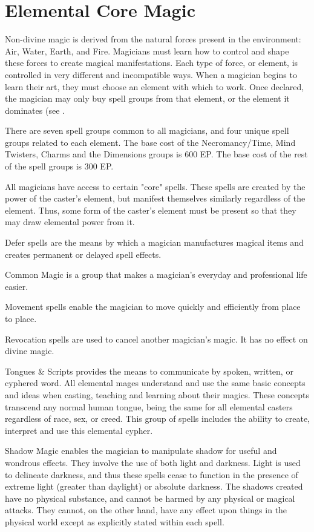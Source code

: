 \chapter{Elemental Core Magic}
\label{ch:elemental-core-magic}
Non-divine magic is derived from the natural forces present in the environment: Air, Water, Earth, and Fire. Magicians must learn how to control and shape these forces to create magical manifestations. Each type of force, or element, is controlled in very different and incompatible ways. When a magician begins to learn their art, they must choose an element with which to work. Once declared, the magician may only buy spell groups from that element, or the element it dominates (see .

There are seven spell groups common to all magicians, and four unique spell groups related to each element. The base cost of the Necromancy/Time, Mind Twisters, Charms and the Dimensions groups is 600 EP. The base cost of the rest of the spell groups is 300 EP.

All magicians have access to certain "core" spells. These spells are created by the power of the caster's element, but manifest themselves similarly regardless of the element. Thus, some form of the caster's element must be present so that they may draw elemental power from it.


Defer spells are the means by which a magician manufactures magical items and creates permanent or delayed spell effects.

Common Magic is a group that makes a magician's everyday and professional life easier.

Movement spells enable the magician to move quickly and efficiently from place to place.

Revocation spells are used to cancel another magician's magic. It has no effect on divine magic.

Tongues \& Scripts provides the means to communicate by spoken, written, or cyphered word. All elemental mages understand and use the same basic concepts and ideas when casting, teaching and learning about their magics. These concepts transcend any normal human tongue, being the same for all elemental casters regardless of race, sex, or creed. This group of spells includes the ability to create, interpret and use
this elemental cypher.

Shadow Magic enables the magician to manipulate shadow for useful and wondrous effects. They involve the use of both light and darkness. Light is used to delineate darkness, and thus these spells cease to function in the presence of extreme
light (greater than daylight) or absolute darkness. The shadows created have no physical substance, and cannot be harmed by any physical or magical attacks. They cannot, on the other hand, have any effect upon things in the physical world except as explicitly stated within each spell.


